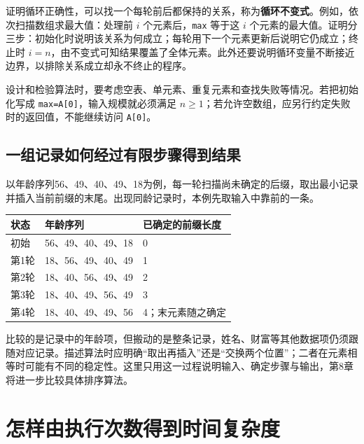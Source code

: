 证明循环正确性，可以找一个每轮前后都保持的关系，称为\textbf{循环不变式}。例如，依次扫描数组求最大值：处理前 \(i\) 个元素后，\texttt{max} 等于这 \(i\) 个元素的最大值。证明分三步：初始化时说明该关系为何成立；每轮用下一个元素更新后说明它仍成立；终止时 \(i=n\)，由不变式可知结果覆盖了全体元素。此外还要说明循环变量不断接近边界，以排除关系成立却永不终止的程序。

设计和检验算法时，要考虑空表、单元素、重复元素和查找失败等情况。若把初始化写成 \texttt{max=\allowbreak{}A[\allowbreak{}0]\allowbreak{}}，输入规模就必须满足 \(n\ge1\)；若允许空数组，应另行约定失败时的返回值，不能继续访问 \texttt{A[\allowbreak{}0]\allowbreak{}}。

\subsection{一组记录如何经过有限步骤得到结果}\label{DS01-sort-example}

以年龄序列56、49、40、49、18为例，每一轮扫描尚未确定的后缀，取出最小记录并插入当前前缀的末尾。出现同龄记录时，本例先取输入中靠前的一条。

\par\medskip\noindent\begin{minipage}{\linewidth}\fontsize{9.3}{12}\selectfont\begin{tabularx}{\linewidth}{@{}YYY@{}}
\toprule\noalign{}
状态 & 年龄序列 & 已确定的前缀长度 \\
\midrule\noalign{}


初始 & 56、49、40、49、18 & 0 \\
第1轮 & 18、56、49、40、49 & 1 \\
第2轮 & 18、40、56、49、49 & 2 \\
第3轮 & 18、40、49、56、49 & 3 \\
第4轮 & 18、40、49、49、56 & 4；末元素随之确定 \\
\bottomrule\end{tabularx}
\end{minipage}\par\medskip

比较的是记录中的年龄项，但搬动的是整条记录，姓名、财富等其他数据项仍须跟随对应记录。描述算法时应明确``取出再插入''还是``交换两个位置''；二者在元素相等时可能有不同的稳定性。这里只用这一过程说明输入、确定步骤与输出，第8章将进一步比较具体排序算法。

\section{怎样由执行次数得到时间复杂度}\label{DS01-03}

